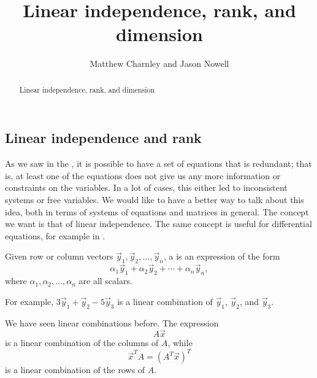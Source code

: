 \documentclass{ximera}
\title{Linear independence, rank, and dimension}
\author{Matthew Charnley and Jason Nowell}
\begin{document}
\begin{abstract}
    Linear independence, rank, and dimension
\end{abstract}
\maketitle

\label{subspaces:section}


\subsection{Linear independence and rank}

As we saw in the , it is possible to have a set of equations that is redundant; that is, at least one of the equations does not give us any more information or constraints on the variables. In a lot of cases, this either led to inconsistent systems or free variables. We would like to have a better way to talk about this idea, both in terms of systems of equations and matrices in general. The concept we want is that of linear independence. The same concept is useful for differential equations, for example in .

\begin{definition}
    Given row or column vectors $\vec{y}_1, \vec{y}_2, \ldots, \vec{y}_n$, a \emph{} is an expression of the form
    \begin{equation*}
        \alpha_1 \vec{y}_1 + \alpha_2 \vec{y}_2 + \cdots + \alpha_n \vec{y}_n ,
    \end{equation*}
    where $\alpha_1, \alpha_2, \ldots, \alpha_n$ are all scalars.
\end{definition}%
For example, $3 \vec{y}_1 + \vec{y}_2 - 5 \vec{y}_3$ is a linear combination of $\vec{y}_1$, $\vec{y}_2$, and $\vec{y}_3$.

We have seen linear combinations before.  The expression
\begin{equation*}
    A \vec{x}
\end{equation*}
is a linear combination of the columns of $A$, while
\begin{equation*}
    \vec{x}^T A = (A^T \vec{x})^T
\end{equation*}
is a linear combination of the rows of $A$.
\end{document}
